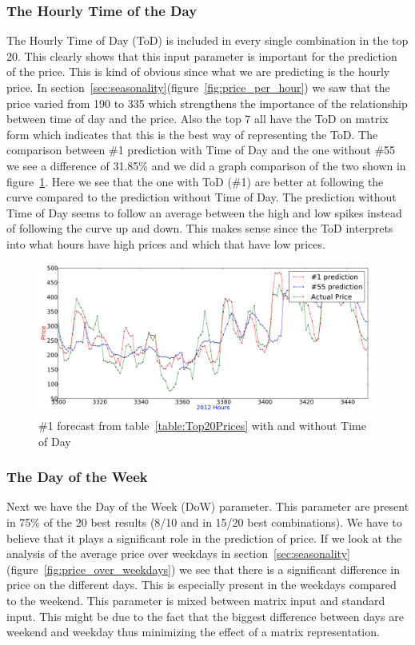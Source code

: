 \subsubsection{The Hourly Time of the Day}
The Hourly Time of Day (ToD) is included in every single combination in the top 20. This clearly shows that this input parameter is important for the prediction of the price. This is kind of obvious since what we are predicting is the hourly price. In section~\ref{sec:seasonality}(figure~\ref{fig:price_per_hour}) we saw that the price varied from 190 to 335 which strengthens the importance of the relationship between time of day and the price. Also the top 7 all have the ToD on matrix form which indicates that this is the best way of representing the ToD. The comparison between \#1 prediction with Time of Day and the one without \#55 we see a difference of 31.85\% and we did a graph comparison of the two shown in figure~\ref{fig:dowComparison}. Here we see that the one with ToD (\#1) are better at following the curve compared to the prediction without Time of Day. The prediction without Time of Day seems to follow an average between the high and low spikes instead of following the curve up and down. This makes sense since the ToD interprets into what hours have high prices and which that have low prices.

\begin{figure}[H]
\centering
\includegraphics[width=\linewidth]{billeder/PriceExperimentalAnalysis/dowComparison.png}
\caption{\#1 forecast from table~\ref{table:Top20Prices} with and without Time of Day}
\label{fig:dowComparison}
\end{figure}

\subsubsection{The Day of the Week}
Next we have the Day of the Week (DoW) parameter. This parameter are present in 75\% of the 20 best results (8/10 and in 15/20 best combinations). We have to believe that it plays a significant role in the prediction of price. If we look at the analysis of the average price over weekdays in section~\ref{sec:seasonality}(figure~\ref{fig:price_over_weekdays}) we see that there is a significant difference in price on the different days. This is especially present in the weekdays compared to the weekend. This parameter is mixed between matrix input and standard input. This might be due to the fact that the biggest difference between days are weekend and weekday thus minimizing the effect of a matrix representation.

